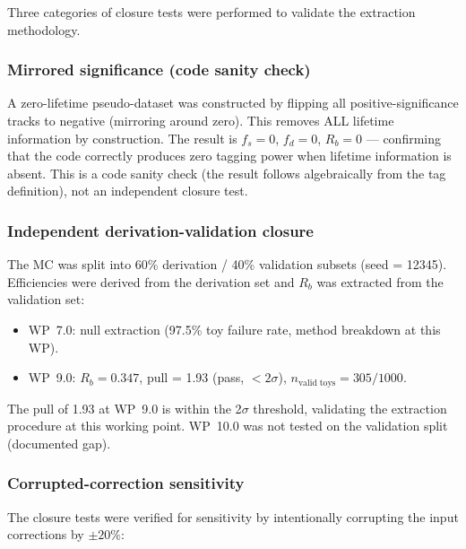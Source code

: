 \documentclass[11pt,a4paper]{article}
\begin{document}
Three categories of closure tests were performed to validate the extraction methodology.

\subsubsection{Mirrored significance (code sanity check)}

A zero-lifetime pseudo-dataset was constructed by flipping all positive-significance
tracks to negative (mirroring around zero). This removes ALL lifetime information by
construction. The result is $f_s = 0$, $f_d = 0$, $R_b = 0$ --- confirming that the
code correctly produces zero tagging power when lifetime information is absent. This is a
code sanity check (the result follows algebraically from the tag definition), not an
independent closure test.

\subsubsection{Independent derivation-validation closure}

The MC was split into 60\% derivation / 40\% validation subsets (seed = 12345).
Efficiencies were derived from the derivation set and $R_b$ was extracted from the
validation set:
\begin{itemize}
\item WP~7.0: null extraction (97.5\% toy failure rate, method breakdown at this WP).
\item WP~9.0: $R_b = 0.347$, pull = 1.93 (pass, $< 2\sigma$), $n_\mathrm{valid\;toys} = 305/1000$.
\end{itemize}

The pull of 1.93 at WP~9.0 is within the 2$\sigma$ threshold, validating the extraction
procedure at this working point. WP~10.0 was not tested on the validation split (documented gap).

\subsubsection{Corrupted-correction sensitivity}

The closure tests were verified for sensitivity by intentionally corrupting the input
corrections by $\pm 20\%$:
\end{document}
